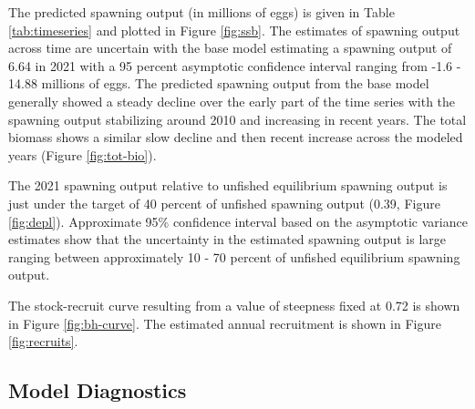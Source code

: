 \documentclass[11pt,
  english,
  letterpaper,
]{article}
\begin{document}
\leavevmode\tagmcend\tagstructend


The predicted spawning output (in millions of eggs) is given in Table \ref{tab:timeseries} and plotted in Figure \ref{fig:ssb}. The estimates of spawning output across time are uncertain with the base model estimating a spawning output of 6.64 in 2021 with a 95 percent asymptotic confidence interval ranging from -1.6 - 14.88 millions of eggs. The predicted spawning output from the base model generally showed a steady decline over the early part of the time series with the spawning output stabilizing around 2010 and increasing in recent years. The total biomass shows a similar slow decline and then recent increase across the modeled years (Figure \ref{fig:tot-bio}).

\leavevmode\tagmcend\tagstructend\par


The 2021 spawning output relative to unfished equilibrium spawning output is just under the target of 40 percent of unfished spawning output (0.39, Figure \ref{fig:depl}). Approximate 95\% confidence interval based on the asymptotic variance estimates show that the uncertainty in the estimated spawning output is large ranging between approximately 10 - 70 percent of unfished equilibrium spawning output.

\leavevmode\tagmcend\tagstructend\par


The stock-recruit curve resulting from a value of steepness fixed at 0.72 is shown in Figure \ref{fig:bh-curve}. The estimated annual recruitment is shown in Figure \ref{fig:recruits}.

\leavevmode\tagmcend\tagstructend\par


\hypertarget{model-diagnostics}{%
\subsection{Model Diagnostics}\label{model-diagnostics}}

\leavevmode\tagmcend\tagstructend

\end{document}
